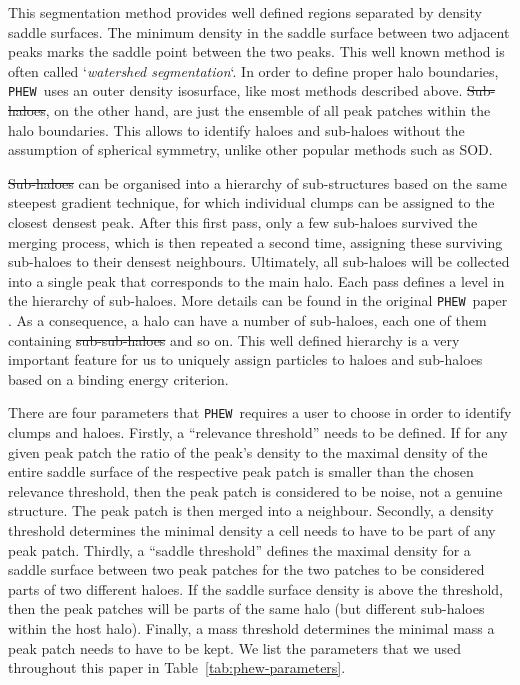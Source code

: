 \documentclass[a4paper,twocolumn,fleqn,usenatbib]{mnras}
\newcommand{\phew}{\texttt{PHEW}}
\providecommand{\DIFadd}[1]{{\protect\color{blue}\uwave{#1}}} %
\providecommand{\DIFdel}[1]{{\protect\color{red}\sout{#1}}}                      %
\providecommand{\DIFaddbegin}{} %
\providecommand{\DIFaddend}{} %
\providecommand{\DIFdelbegin}{} %
\providecommand{\DIFdelend}{} %
\newcommand{\DIFscaledelfig}{0.5}
\newlength{\DIFdelgraphicswidth} %
\newlength{\DIFdelgraphicsheight} %
\newcommand{\DIFaddincludegraphics}[2][]{{\color{blue}\fbox{\DIFOincludegraphics[#1]{#2}}}} %
\newcommand{\DIFdelincludegraphics}[2][]{%
\sbox{\DIFdelgraphicsbox}{\DIFOincludegraphics[#1]{#2}}%
\settoboxwidth{\DIFdelgraphicswidth}{\DIFdelgraphicsbox} %
\settoboxtotalheight{\DIFdelgraphicsheight}{\DIFdelgraphicsbox} %
\scalebox{\DIFscaledelfig}{%
\parbox[b]{\DIFdelgraphicswidth}{\usebox{\DIFdelgraphicsbox}\\[-\baselineskip] \rule{\DIFdelgraphicswidth}{0em}}\llap{\resizebox{\DIFdelgraphicswidth}{\DIFdelgraphicsheight}{%
\setlength{\unitlength}{\DIFdelgraphicswidth}%
\begin{picture}(1,1)%
\thicklines\linethickness{2pt} %
{\color[rgb]{1,0,0}\put(0,0){\framebox(1,1){}}}%
{\color[rgb]{1,0,0}\put(0,0){\line( 1,1){1}}}%
{\color[rgb]{1,0,0}\put(0,1){\line(1,-1){1}}}%
\end{picture}%
}\hspace*{3pt}}} %
} %
\DeclareRobustCommand{\DIFaddbegin}{\DIFOaddbegin \let\includegraphics\DIFaddincludegraphics} %
\DeclareRobustCommand{\DIFaddend}{\DIFOaddend \let\includegraphics\DIFOincludegraphics} %
\DeclareRobustCommand{\DIFdelbegin}{\DIFOdelbegin \let\includegraphics\DIFdelincludegraphics} %
\DeclareRobustCommand{\DIFdelend}{\DIFOaddend \let\includegraphics\DIFOincludegraphics} %
\begin{document}
This segmentation method provides well defined regions separated by
density saddle surfaces. The minimum density in the saddle surface
between two adjacent peaks marks the saddle point between the two
peaks.  This well known method is often called `\emph{watershed
segmentation}`. In order to define proper halo boundaries, \phew\ uses
an outer density isosurface, like most methods described
above. \DIFdelbegin \DIFdel{Sub-haloes}\DIFdelend \DIFaddbegin \DIFadd{Subhaloes}\DIFaddend , on the other hand, are just the ensemble of all
peak patches within the halo boundaries. This allows to identify
haloes and sub-haloes without the assumption of spherical symmetry,
unlike other popular methods such as SOD.

\DIFdelbegin \DIFdel{Sub-haloes }\DIFdelend \DIFaddbegin \DIFadd{Subhaloes }\DIFaddend can be organised into a hierarchy of sub-structures based
on the same steepest gradient technique, for which individual clumps
can be assigned to the closest densest peak.  After this first pass,
only a few sub-haloes survived the merging process, which is then
repeated a second time, assigning these surviving sub-haloes to their
densest neighbours.  Ultimately, all sub-haloes will be collected into
a single peak that corresponds to the main halo. Each pass defines a
level in the hierarchy of sub-haloes. More details can be found in the
original \phew\ paper \citep{PHEW}.  As a consequence, a halo can have
a number of sub-haloes, each one of them containing \DIFdelbegin \DIFdel{sub-sub-haloes }\DIFdelend \DIFaddbegin \DIFadd{subsub-haloes }\DIFaddend and
so on.  This well defined hierarchy is a very important feature for us
to uniquely assign particles to haloes and sub-haloes based on a
binding energy criterion.

There are four parameters that \phew\ requires a user to choose in
order to identify clumps and haloes.  Firstly, a ``relevance
threshold'' needs to be defined.  If for any given peak patch the
ratio of the peak's density to the maximal density of the entire
saddle surface of the respective peak patch is smaller than the chosen
relevance threshold, then the peak patch is considered to be noise,
not a genuine structure.  The peak patch is then merged into a
neighbour.  Secondly, a density threshold determines the minimal
density a cell needs to have to be part of any peak patch.  Thirdly, a
``saddle threshold'' defines the maximal density for a saddle surface
between two peak patches for the two patches to be considered parts of
two different haloes.  If the saddle surface density is above the
threshold, then the peak patches will be parts of the same halo (but
different sub-haloes within the host halo).  Finally, a mass threshold
determines the minimal mass a peak patch needs to have to be kept.  We
list the parameters that we used throughout this paper in Table~\ref{tab:phew-parameters}.
\end{document}
